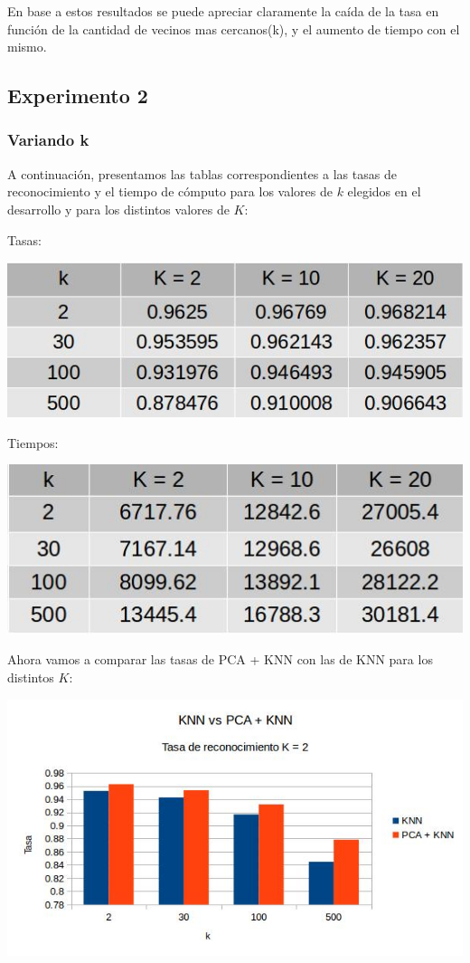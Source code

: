 En base a estos resultados se puede apreciar claramente la caída de la tasa en función de la cantidad de vecinos mas cercanos(k), y el aumento de tiempo con el mismo.

\subsection{Experimento 2}
\subsubsection{Variando k}
A continuación, presentamos las tablas correspondientes a las tasas de reconocimiento y el tiempo de cómputo para los valores de $k$ elegidos en el desarrollo y para los distintos valores de $K$:
\newline
\newline
\centerline{Tasas:}
\newline
\centerline{
\includegraphics[scale=0.4]{Tablas/variandoktr.jpg}
}
\newline
\newline
\centerline{Tiempos:}
\newline
\centerline{
\includegraphics[scale=0.4]{Tablas/variandok.jpg}
}
\newline
\newline
Ahora vamos a comparar las tasas de PCA + KNN con las de KNN para los distintos $K$:
\newline
\newline
\centerline{
\includegraphics[scale=0.5]{Tablas/comtrK2.jpg}
}

